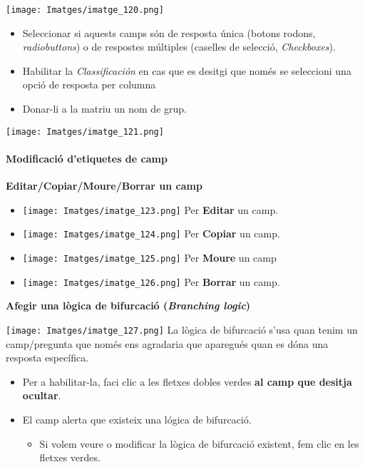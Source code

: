 \documentclass[
]{article}
\providecommand{\tightlist}{%
  \setlength{\itemsep}{0pt}\setlength{\parskip}{0pt}}
\begin{document}
\texttt{[image: Imatges/imatge\_120.png]}

\begin{itemize}
\tightlist
\item
  Seleccionar si aquests camps són de resposta única (botons rodons, \emph{radiobuttons}) o de respostes múltiples (caselles de selecció, \emph{Checkboxes}).
\item
  Habilitar la \emph{Classificación} en cas que es desitgi que només se seleccioni una opció de resposta per columna
\item
  Donar-li a la matriu un nom de grup.
\end{itemize}

\texttt{[image: Imatges/imatge\_121.png]}

\hypertarget{modificaciuxf3-detiquetes-de-camp}{%
\paragraph{Modificació d'etiquetes de camp}\label{modificaciuxf3-detiquetes-de-camp}}

\textbf{Editar/Copiar/Moure/Borrar un camp}

\begin{itemize}
\tightlist
\item
  \texttt{[image: Imatges/imatge\_123.png]} Per \textbf{Editar} un camp.
\item
  \texttt{[image: Imatges/imatge\_124.png]} Per \textbf{Copiar} un camp.
\item
  \texttt{[image: Imatges/imatge\_125.png]} Per \textbf{Moure} un camp
\item
  \texttt{[image: Imatges/imatge\_126.png]} Per \textbf{Borrar} un camp.
\end{itemize}

\textbf{Afegir una lògica de bifurcació (\emph{Branching logic})}

\texttt{[image: Imatges/imatge\_127.png]} La lògica de bifurcació s'usa quan tenim un camp/pregunta que només ens agradaria que aparegués quan es dóna una resposta específica.

\begin{itemize}
\tightlist
\item
  Per a habilitar-la, faci clic a les fletxes dobles verdes \textbf{al camp que desitja ocultar}.
\item
  El camp alerta que existeix una lógica de bifurcació.

  \begin{itemize}
  \tightlist
  \item
    Si volem veure o modificar la lògica de bifurcació existent, fem clic en les fletxes verdes.
  \end{itemize}
\end{itemize}
\end{document}
